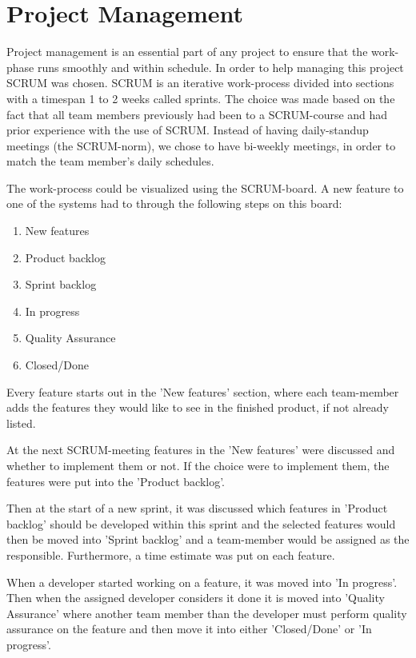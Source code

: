 \chapter{Project Management}
Project management is an essential part of any project to ensure that the work-phase runs smoothly and within schedule. In order to help managing this project SCRUM was chosen. SCRUM is an iterative work-process divided into sections with a timespan 1 to 2 weeks called sprints.
The choice was made based on the fact that all team members previously had been to a SCRUM-course and had prior experience with the use of SCRUM. Instead of having daily-standup meetings (the SCRUM-norm), we chose to have bi-weekly meetings, in order to match the team member's daily schedules.

The work-process could be visualized using the SCRUM-board. A new feature to one of the systems had to through the following steps on this board:
\begin{enumerate}
	\item New features
	\item Product backlog
	\item Sprint backlog
	\item In progress
	\item Quality Assurance
	\item Closed/Done
\end{enumerate}

Every feature starts out in the 'New features' section, where each team-member adds the features they would like to see in the finished product, if not already listed.

At the next SCRUM-meeting features in the 'New features' were discussed and whether to implement them or not. If the choice were to implement them, the features were put into the 'Product backlog'.

Then at the start of a new sprint, it was discussed which features in 'Product backlog' should be developed within this sprint and the selected features would then be moved into 'Sprint backlog' and a team-member would be assigned as the responsible. Furthermore, a time estimate was put on each feature.

When a developer started working on a feature, it was moved into 'In progress'. Then when the assigned developer considers it done it is moved into 'Quality Assurance' where another team member than the developer must perform quality assurance on the feature and then move it into either 'Closed/Done' or 'In progress'.

